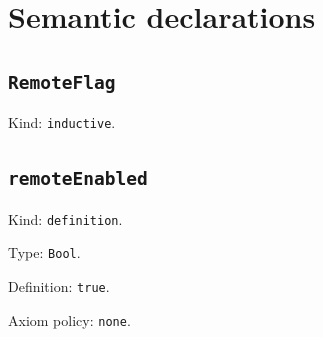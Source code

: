 \documentclass[11pt]{article}
\begin{document}
\section*{Semantic declarations}
\subsection*{\texttt{RemoteFlag}}
\noindent Kind: \texttt{inductive}.\par
\subsection*{\texttt{remoteEnabled}}
\noindent Kind: \texttt{definition}.\par
\noindent Type: \texttt{Bool}.\par
\noindent Definition: \texttt{true}.\par
\noindent Axiom policy: \texttt{none}.\par
\end{document}
